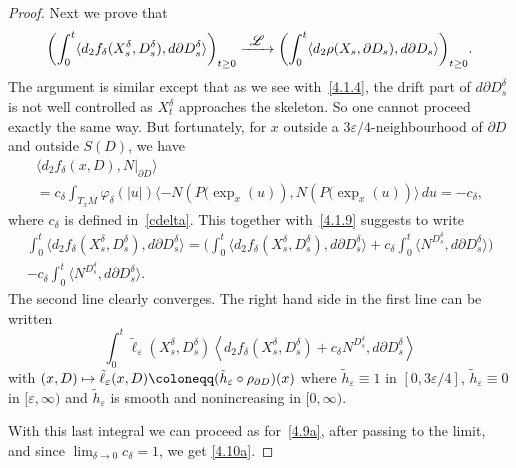 \documentclass[JEP,XML,SOM,Unicode,NoFloatCountersInSection,published]{cedram}
\newcommand\mto{\mathchoice{\longmapsto}{\mapsto}{\mapsto}{\mapsto}}
\newcommand\To[1]{\mathchoice{\xrightarrow{\textstyle\kern4pt#1\kern3pt}}{\stackrel{#1}{\longrightarrow}}{}{}}
\theoremstyle{plain}
\theoremstyle{definition}
\newcommand{\SL}{{\mathscr L}}
\newcommand\df{\coloneqq}
\let\d\delta
\let\e\varepsilon
\begin{document}
\begin{proof}
Next we prove that\vspace*{-3pt}
\begin{equation}
\label{4.10}
\biggl(\int_0^t\langle d_2f_\d(X_s^\d, D_s^\d), d\partial D_s^\d\rangle\biggr)_{t\ge 0}\To{\SL}\biggl(\int_0^t\langle d_2\rho (X_s,\partial D_s), d\partial D_s\rangle\biggr)_{t\ge 0}.
\end{equation}
The argument is similar except that as we see with~\eqref{4.1.4}, the drift part of $d\partial D_s^\d$ is not well controlled as $X_t^\d$ approaches the skeleton. So one cannot proceed exactly the same way. But fortunately, for $x$ outside a $3\e/4$-neighbourhood of $\partial D$ and outside $S(D)$, we have\vspace*{-3pt}
\begin{multline}
\label{4.10a}
\langle d_2 f_\d(x,D), N|_{\partial D}\rangle \\[-3pt]
=c_\d\int_{T_xM}\varphi_\d(\vert u\vert )\langle -N\left(P(\exp_x(u)\right), N\left(P(\exp_x(u)\right)\rangle \, du=-c_\d,
\end{multline}
where $c_\d$ is defined in~\eqref{cdelta}.
This together with~\eqref{4.1.9} suggests to write\vspace*{-3pt}
\begin{multline*}
\int_0^t\langle d_2f_\d(X_s^\d, D_s^\d), d\partial D_s^\d\rangle=\biggl(\int_0^t\langle d_2f_\d(X_s^\d, D_s^\d), d\partial D_s^\d\rangle+ c_\d \int_0^t \langle N^{D^{\d}_s}, d \partial D^{\d}_s \rangle \biggr)\\[-3pt]
-c_\d\int_0^t \langle N^{D^{\d}_s}, d \partial D^{\d}_s \rangle.
\end{multline*}
The second line clearly converges. The
right hand side in the first line can be written\vspace*{-3pt}
\begin{equation}
\int_0^t\tilde\ell_{\e}(X_s^\d, D_s^\d) \left\langle d_2f_\d(X_s^\d, D_s^\d)+c_\d N^{D^{\d}_s}, d\partial D_s^\d\right\rangle
\end{equation}
with
$(x,D)\mto \tilde\ell_\e(x,D)\df(\tilde h_\e\circ \rho_{\partial D})(x)$ where $\tilde h_\e\equiv 1$ in $[0,3\e/4]$, $\tilde h_\e\equiv 0$ in $[\e,\infty)$ and $\tilde h_\e$ is smooth and nonincreasing in $[0,\infty)$.

With this last integral we can proceed as for~\eqref{4.9a}, after passing to the limit, and since $ \lim_{\d \to 0} c_\d = 1$, we get \eqref{4.10a}.


\end{proof}
\end{document}
